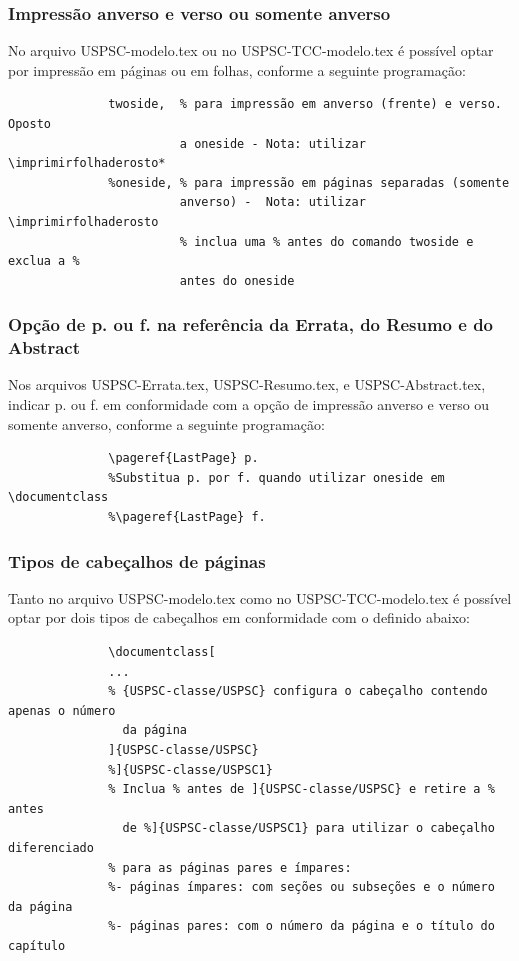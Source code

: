 \subsubsection{Impressão anverso e verso ou somente anverso}
No arquivo USPSC-modelo.tex ou no USPSC-TCC-modelo.tex é possível optar por impressão em páginas ou em folhas, conforme a seguinte programação:
			  \begin{verbatim}
			  twoside,  % para impressão em anverso (frente) e verso. Oposto 
			            a oneside - Nota: utilizar \imprimirfolhaderosto*
			  %oneside, % para impressão em páginas separadas (somente 
			            anverso) -  Nota: utilizar \imprimirfolhaderosto
			            % inclua uma % antes do comando twoside e exclua a % 
			            antes do oneside 
			  \end{verbatim}			  
\subsubsection{Opção de p. ou f. na referência da Errata, do Resumo e do Abstract} 
 Nos arquivos USPSC-Errata.tex, USPSC-Resumo.tex, e USPSC-Abstract.tex, indicar p. ou f. em conformidade com a opção de impressão anverso e verso ou somente anverso, conforme a seguinte programação:
			  \begin{verbatim}
			  \pageref{LastPage} p. 
			  %Substitua p. por f. quando utilizar oneside em \documentclass
			  %\pageref{LastPage} f.
			  \end{verbatim}			  
\subsubsection{Tipos de cabeçalhos de páginas} 
Tanto no arquivo USPSC-modelo.tex como no USPSC-TCC-modelo.tex é possível optar por dois tipos de cabeçalhos em conformidade com o definido abaixo:
			  \begin{verbatim}
			  \documentclass[
			  ...
			  % {USPSC-classe/USPSC} configura o cabeçalho contendo apenas o número
			    da página
			  ]{USPSC-classe/USPSC}
			  %]{USPSC-classe/USPSC1}
			  % Inclua % antes de ]{USPSC-classe/USPSC} e retire a % antes 
			    de %]{USPSC-classe/USPSC1} para utilizar o cabeçalho diferenciado
			  % para as páginas pares e ímpares: 
			  %- páginas ímpares: com seções ou subseções e o número da página
			  %- páginas pares: com o número da página e o título do capítulo 
			  \end{verbatim}
